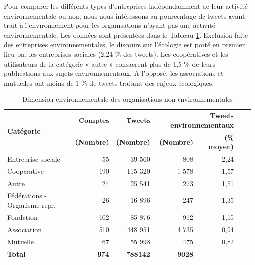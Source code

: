     Pour comparer les différents types d’entreprises indépendamment de leur activité environnementale ou non, nous nous intéressons au pourcentage de tweets ayant trait à l’environnement pour les organisations n’ayant pas une activité environnementale. Les données sont présentées dans le Tableau \ref{table:dimenenvirtypecomptenonenvir}. Exclusion faite des entreprises environnementales, le discours sur l’écologie est porté en premier lieu par les entreprises sociales (2,24 \% des tweets). Les coopératives et les utilisateurs de la catégorie « autre » consacrent plus de 1,5 \% de leurs publications aux sujets environnementaux. A l’opposé, les associations et mutuelles ont moins de 1 \% de tweets traitant des enjeux écologiques. \\


    \begin{table}
    \caption{Dimension environnementale des organisations non environnementales}
    \label{table:dimenenvirtypecomptenonenvir}
    \footnotesize

        \begin{tabularx}{\linewidth}{|X|r|r|r|r|r|r|}
        \hline

        \multirow{2}{*}{\textbf{Catégorie}}
        &\textbf{Comptes}
        &\textbf{Tweets}
        &\multicolumn{2}{|X|}{\textbf{Tweets environnementaux}} \\ \cline{2-5}

        &\textbf{(Nombre)}
        &\textbf{(Nombre)}
        &\textbf{(Nombre)}
        &\textbf{(\% moyen)} \\ \hline

       Entreprise sociale &	55 &	39 560 &	808 &	2,24 \\ \hline
        Coopérative	& 190 &	115 320 &	1 578 &	1,57 \\ \hline
        Autre	& 24 &	25 541 &	273 &	1,51 \\ \hline
        Fédérations - Organisme repr.	& 26 &	16 896	&247	&1,35 \\ \hline
        Fondation	& 102 &	85 876 &	912&	1,15 \\ \hline
        Association	& 510 &	448 951&	4 735&	0,94 \\ \hline
        Mutuelle	& 67 &	55 998&	475&	0,82 \\ \hline

        \textbf{Total} &	\textbf{974} &	\textbf{788142} &	\textbf{9028} &	\textbf{} \\ \hline

        \end{tabularx}
    \end{table}

